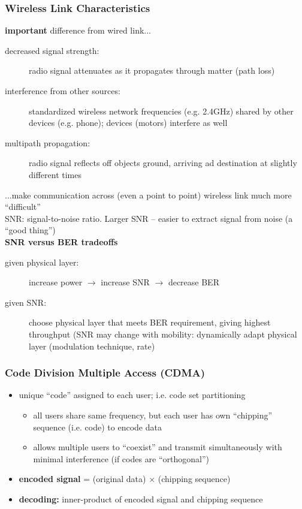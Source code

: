 \subsubsection{Wireless Link Characteristics}
\textbf{important} difference from wired link...
\begin{description}
	\item[decreased signal strength:] radio signal attenuates as it propagates through matter (path loss)
	\item[interference from other sources:] standardized wireless network frequencies (e.g. 2.4GHz) shared by other devices (e.g. phone); devices (motors) interfere as well
	\item[multipath propagation:] radio signal reflects off objects ground, arriving ad destination at slightly different times
\end{description}
...make communication across (even a point to point) wireless link much more ``difficult''\\
SNR: signal-to-noise ratio. Larger SNR -- easier to extract signal from noise (a ``good thing'')\\
\textbf{SNR versus BER tradeoffs}
\begin{description}
	\item[given physical layer:] increase power $\rightarrow$ increase SNR $\rightarrow$ decrease BER
	\item[given SNR:] choose physical layer that meets BER requirement, giving highest throughput (SNR may change with mobility: dynamically adapt physical layer (modulation technique, rate)
\end{description}
\subsubsection{Code Division Multiple Access (CDMA)}
\begin{itemize}
	\item unique ``code'' assigned to each user; i.e. code set partitioning
	\begin{itemize}
		\item all users share same frequency, but each user has own ``chipping'' sequence (i.e. code) to encode data
		\item allows multiple users to ``coexist'' and transmit simultaneously with minimal interference (if codes are ``orthogonal'')
	\end{itemize}
	\item \textbf{encoded signal} = (original data) $\times$ (chipping sequence)
	\item \textbf{decoding:} inner-product of encoded signal and chipping sequence
\end{itemize}

